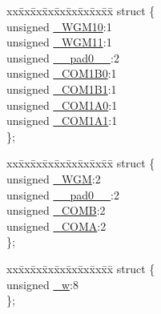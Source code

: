 \begin{DoxyCompactItemize}
\item 
\begin{tabbing}
xx\=xx\=xx\=xx\=xx\=xx\=xx\=xx\=xx\=\kill
struct \{\\
\>unsigned \hyperlink{union_____t_c_c_r1_abits__t_add5c47895346d95c54b92a7f656536b3}{\_WGM10}:1\\
\>unsigned \hyperlink{union_____t_c_c_r1_abits__t_a39ca1f337bf8f7399a40abbdea0fa677}{\_WGM11}:1\\
\>unsigned \hyperlink{union_____t_c_c_r1_abits__t_aa18fc8dbd0f9d5c422019b76eab4b875}{\_\_pad0\_\_}:2\\
\>unsigned \hyperlink{union_____t_c_c_r1_abits__t_a51f09ffdaa59af8b23e1fa53b3bdac69}{\_COM1B0}:1\\
\>unsigned \hyperlink{union_____t_c_c_r1_abits__t_af5c46cba9c89af19b913166047d4c298}{\_COM1B1}:1\\
\>unsigned \hyperlink{union_____t_c_c_r1_abits__t_a1e4a4dac7814a51abf8d43337d8f2e4c}{\_COM1A0}:1\\
\>unsigned \hyperlink{union_____t_c_c_r1_abits__t_a6e736d233beb6247eca03b740a79cda4}{\_COM1A1}:1\\
\}; \\

\end{tabbing}\item 
\begin{tabbing}
xx\=xx\=xx\=xx\=xx\=xx\=xx\=xx\=xx\=\kill
struct \{\\
\>unsigned \hyperlink{union_____t_c_c_r1_abits__t_aa9faf3e5a3dea9623ac8bed36fc9e888}{\_WGM}:2\\
\>unsigned \hyperlink{union_____t_c_c_r1_abits__t_aa18fc8dbd0f9d5c422019b76eab4b875}{\_\_pad0\_\_}:2\\
\>unsigned \hyperlink{union_____t_c_c_r1_abits__t_aac14d2ce9eef209c034c717d8e807e65}{\_COMB}:2\\
\>unsigned \hyperlink{union_____t_c_c_r1_abits__t_a3b830264ef9b6a65c940f38fccde1eb2}{\_COMA}:2\\
\}; \\

\end{tabbing}\item 
\begin{tabbing}
xx\=xx\=xx\=xx\=xx\=xx\=xx\=xx\=xx\=\kill
struct \{\\
\>unsigned \hyperlink{union_____t_c_c_r1_abits__t_a6b8d6d0134721dcb23f82cf341923656}{\_w}:8\\
\}; \\

\end{tabbing}\end{DoxyCompactItemize}


